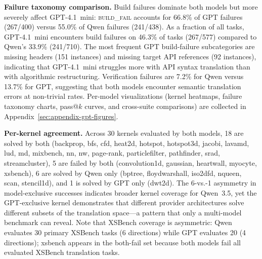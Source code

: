 \documentclass{article}
\begin{document}
\textbf{Failure taxonomy comparison.}
Build failures dominate both models but more severely affect GPT-4.1~mini:
\textsc{build\_fail} accounts for 66.8\% of GPT failures (267/400) versus
55.0\% of Qwen failures (241/438). As a fraction of all tasks, GPT-4.1~mini
encounters build failures on 46.3\% of tasks (267/577) compared to Qwen's
33.9\% (241/710). The most frequent GPT build-failure subcategories are
missing headers (151 instances) and missing target API references (92
instances), indicating that GPT-4.1~mini struggles more with API syntax
translation than with algorithmic restructuring. Verification failures
are 7.2\% for Qwen versus 13.7\% for GPT, suggesting that
both models encounter semantic translation errors at non-trivial rates.
Per-model visualizations (kernel heatmaps, failure taxonomy charts,
pass@$k$ curves, and cross-suite comparisons) are collected in
Appendix~\ref{sec:appendix-gpt-figures}.

\textbf{Per-kernel agreement.}
Across 30 kernels evaluated by both models, 18 are solved by both
(backprop, bfs, cfd, heat2d, hotspot, hotspot3d, jacobi, lavamd, lud, md,
mixbench, nn, nw, page-rank, particlefilter, pathfinder, srad,
streamcluster), 5 are failed by both (convolution1d, gaussian, heartwall,
myocyte, xsbench), 6 are solved by Qwen only (bptree, floydwarshall,
iso2dfd, nqueen, scan, stencil1d), and 1 is solved by GPT only (dwt2d).
The 6-vs.-1 asymmetry in model-exclusive successes indicates broader
kernel coverage for Qwen~3.5, yet the GPT-exclusive kernel demonstrates
that different provider architectures solve different subsets of the
translation space---a pattern that only a multi-model benchmark can
reveal. Note that XSBench coverage is asymmetric: Qwen evaluates
30 primary XSBench tasks (6 directions) while GPT evaluates 20
(4 directions); xsbench appears in the both-fail set because
both models fail all evaluated XSBench translation tasks.
\end{document}
